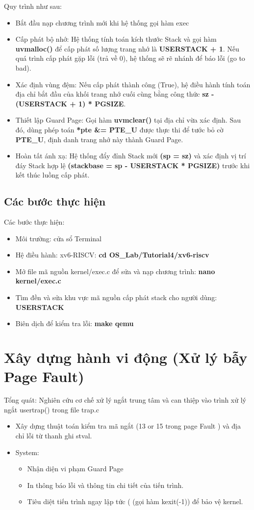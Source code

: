 Quy trình như sau:
\begin{itemize}
    \item Bắt đầu nạp chương trình mới khi hệ thống gọi hàm exec
    \item Cấp phát bộ nhớ: Hệ thống tính toán kích thước Stack và gọi hàm \textbf{uvmalloc()} để cấp phát số lượng trang nhớ là \textbf{USERSTACK + 1}. Nếu quá trình cấp phát gặp lỗi (trả về 0), hệ thống sẽ rẽ nhánh để báo lỗi (go to bad).
    \item Xác định vùng đệm: Nếu cấp phát thành công (True), hệ điều hành tính toán địa chỉ bắt đầu của khối trang nhớ cuối cùng bằng công thức \textbf{sz - (USERSTACK + 1) * PGSIZE}.
    \item Thiết lập Guard Page: Gọi hàm \textbf{uvmclear()} tại địa chỉ vừa xác định. Sau đó, dùng phép toán \textbf{*pte \&= \~PTE\_U} được thực thi để tước bỏ cờ \textbf{PTE\_U}, định danh trang nhớ này thành Guard Page.
    \item Hoàn tất ánh xạ: Hệ thống đẩy đỉnh Stack mới \textbf{(sp = sz)} và xác định vị trí đáy Stack hợp lệ \textbf{(stackbase = sp - USERSTACK * PGSIZE)} trước khi kết thúc luồng cấp phát.
\end{itemize}
\subsection{Các bước thực hiện}
Các bước thực hiện:
\begin{itemize}
    \item Môi trường: cửa sổ Terminal
    \item Hệ điều hành: xv6-RISCV: \textbf{cd OS\_Lab/Tutorial4/xv6-riscv}
    \item Mở file mã nguồn kernel/exec.c để sửa và nạp chương trình: \textbf{nano kernel/exec.c}
    \item Tìm đền và sửa khu vực mã nguồn cấp phát stack cho người dùng: \textbf{USERSTACK}
   
    \item Biên dịch để kiểm tra lỗi: \textbf{make qemu}
\end{itemize}


\section{Xây dựng hành vi động (Xử lý bẫy Page Fault)}
Tổng quát:
Nghiên cứu cơ chế xử lý ngắt trung tâm và can thiệp vào trình xử lý ngắt usertrap() trong file trap.c
\begin{itemize}
    \item Xây dựng thuật toán kiểm tra mã ngắt (13 or 15 trong page Fault ) và địa chỉ lỗi từ thanh ghi stval.
    \item System: 
    \begin{itemize}
        \item Nhận diện vi phạm Guard Page
        \item In thông báo lỗi và thông tin chi tiết của tiến trình.
        \item Tiêu diệt tiến trình ngay lập tức ( (gọi hàm kexit(-1)) để bảo vệ kernel.
    \end{itemize}
\end{itemize}


